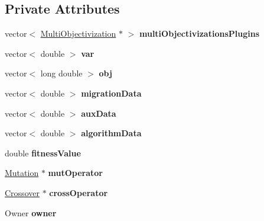 \subsection*{Private Attributes}
\begin{DoxyCompactItemize}
\item 
\mbox{\label{classIndividual_a3a418fa4c1acb6d9b470bae8ae4f765b}} 
vector$<$ \mbox{\hyperlink{classMultiObjectivization}{Multi\+Objectivization}} $\ast$ $>$ {\bfseries multi\+Objectivizations\+Plugins}
\item 
\mbox{\label{classIndividual_a3422766f76333dc26094622a2507f2c5}} 
vector$<$ double $>$ {\bfseries var}
\item 
\mbox{\label{classIndividual_aeaea908497019d83d1faeb1b14b24806}} 
vector$<$ long double $>$ {\bfseries obj}
\item 
\mbox{\label{classIndividual_a52f5c8cae2417f71793bb62a2149159e}} 
vector$<$ double $>$ {\bfseries migration\+Data}
\item 
\mbox{\label{classIndividual_acb44f6c44e7f7c958b9f87172c1864e1}} 
vector$<$ double $>$ {\bfseries aux\+Data}
\item 
\mbox{\label{classIndividual_a7d2478a023c6de2d9d16dbd49af196b0}} 
vector$<$ double $>$ {\bfseries algorithm\+Data}
\item 
\mbox{\label{classIndividual_adfe2e2d7b2f06dc4721f0a13c9b705af}} 
double {\bfseries fitness\+Value}
\item 
\mbox{\label{classIndividual_a0cc18b1635d07e4d5c09541cfd4fffa4}} 
\mbox{\hyperlink{classMutation}{Mutation}} $\ast$ {\bfseries mut\+Operator}
\item 
\mbox{\label{classIndividual_a9c3141911458653cfb75073a51d08dc5}} 
\mbox{\hyperlink{classCrossover}{Crossover}} $\ast$ {\bfseries cross\+Operator}
\item 
\mbox{\label{classIndividual_aa65e054afcae994f99941559260f74f9}} 
Owner {\bfseries owner}
\end{DoxyCompactItemize}
